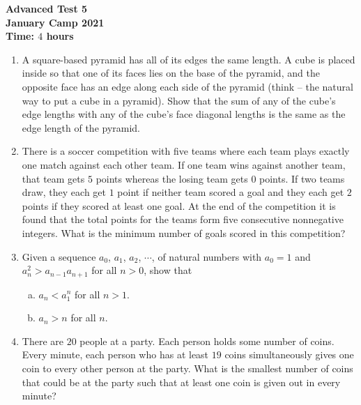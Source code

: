 \documentclass{article}
\begin{document}
\thispagestyle{empty}

\begin{center}
  \textbf{\Large Advanced Test 5}
  \\ \vspace{1em}
  \textbf{\large January Camp 2021}
  \\ \vspace{1em}
  \textbf{\large Time: $4$ hours}
\end{center}

\vspace{12pt}

\begin{enumerate}[1.]

\item %
A square-based pyramid has all of its edges the same length.
A cube is placed inside so that one of its faces lies on the base of the pyramid, and the opposite face has an edge along each side of the pyramid (think -- the natural way to put a cube in a pyramid).
Show that the sum of any of the cube's edge lengths with any of the cube's face diagonal lengths is the same as the edge length of the pyramid.


\item %
There is a soccer competition with five teams where each team plays exactly one match against each other team.
If one team wins against another team, that team gets $5$ points whereas the losing team gets $0$ points.
If two teams draw, they each get $1$ point if neither team scored a goal and they each get $2$ points if they scored at least one goal.
At the end of the competition it is found that the total points for the teams form five consecutive nonnegative integers.
What is the minimum number of goals scored in this competition?


\item %
Given a sequence $a_0$, $a_1$, $a_2$, $\cdots$, of natural numbers with $a_0 = 1$ and $a_{n}^2 > a_{n - 1}a_{n + 1}$ for all $n > 0$, show that 
\begin{enumerate}[a)]
  \item $a_n < a_1^n$ for all $n > 1$.
  \item $a_n > n$ for all $n$.
\end{enumerate}


\item %
There are $20$ people at a party. Each person holds some number of coins. Every minute, each person who has at least $19$ coins simultaneously gives one coin to every other person at the party. What is the smallest number of coins that could be at the party such that at least one coin is given out in every minute? 



\end{enumerate}
\end{document}
